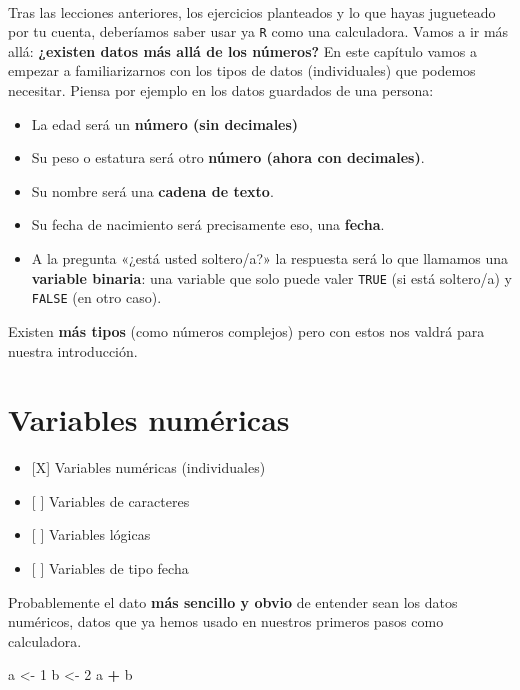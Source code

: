 \documentclass[11pt,]{book}
\newenvironment{Shaded}{\begin{snugshade}}{\end{snugshade}}
\newcommand{\DecValTok}[1]{\textcolor[rgb]{0.06,0.06,0.06}{#1}}
\newcommand{\NormalTok}[1]{#1}
\newcommand{\OperatorTok}[1]{\textcolor[rgb]{0.43,0.43,0.43}{\textbf{#1}}}
\newcommand{\StringTok}[1]{\textcolor[rgb]{0.5,0.5,0.5}{#1}}
\providecommand{\tightlist}{%
  \setlength{\itemsep}{0pt}\setlength{\parskip}{0pt}}
\begin{document}
~

Tras las lecciones anteriores, los ejercicios planteados y lo que hayas jugueteado por tu cuenta, deberíamos saber usar ya \texttt{R} como una calculadora. Vamos a ir más allá: \textbf{¿existen datos más allá de los números?} En este capítulo vamos a empezar a familiarizarnos con los tipos de datos (individuales) que podemos necesitar. Piensa por ejemplo en los datos guardados de una persona:

\begin{itemize}
\tightlist
\item
  La edad será un \textbf{número (sin decimales)}
\item
  Su peso o estatura será otro \textbf{número (ahora con decimales)}.
\item
  Su nombre será una \textbf{cadena de texto}.
\item
  Su fecha de nacimiento será precisamente eso, una \textbf{fecha}.
\item
  A la pregunta «¿está usted soltero/a?» la respuesta será lo que llamamos una \textbf{variable binaria}: una variable que solo puede valer \texttt{TRUE} (si está soltero/a) y \texttt{FALSE} (en otro caso).
\end{itemize}

Existen \textbf{más tipos} (como números complejos) pero con estos nos valdrá para nuestra introducción.

\hypertarget{numericas}{%
\section{Variables numéricas}\label{numericas}}

\begin{itemize}
\tightlist
\item
  {[}X{]} Variables numéricas (individuales)
\item
  {[} {]} Variables de caracteres
\item
  {[} {]} Variables lógicas
\item
  {[} {]} Variables de tipo fecha
\end{itemize}

Probablemente el dato \textbf{más sencillo y obvio} de entender sean los datos numéricos, datos que ya hemos usado en nuestros primeros pasos como calculadora.

\begin{Shaded}
\begin{Highlighting}[]
\NormalTok{a <-}\StringTok{ }\DecValTok{1}
\NormalTok{b <-}\StringTok{ }\DecValTok{2}
\NormalTok{a }\OperatorTok{+}\StringTok{ }\NormalTok{b}
\end{Highlighting}
\end{Shaded}
\end{document}
